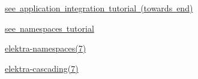 \begin{DoxyItemize}
\item \mbox{\hyperlink{doc_tutorials_application-integration_md}{see application integration tutorial (towards end)}}
\item \mbox{\hyperlink{doc_tutorials_namespaces_md}{see namespaces tutorial}}
\item \mbox{\hyperlink{doc_help_elektra-namespaces_md}{elektra-\/namespaces(7)}}
\item \mbox{\hyperlink{doc_help_elektra-cascading_md}{elektra-\/cascading(7)}} 
\end{DoxyItemize}